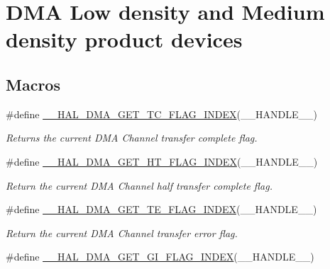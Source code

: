 \hypertarget{group___d_m_a___low__density___medium__density___product__devices}{}\section{D\+MA Low density and Medium density product devices}
\label{group___d_m_a___low__density___medium__density___product__devices}
\subsection*{Macros}
\begin{DoxyCompactItemize}
\item 
\#define \hyperlink{group___d_m_a___low__density___medium__density___product__devices_gae3feef5ea50ff13a6a5b98cb353c87b0}{\+\_\+\+\_\+\+H\+A\+L\+\_\+\+D\+M\+A\+\_\+\+G\+E\+T\+\_\+\+T\+C\+\_\+\+F\+L\+A\+G\+\_\+\+I\+N\+D\+EX}(\+\_\+\+\_\+\+H\+A\+N\+D\+L\+E\+\_\+\+\_\+)
\begin{DoxyCompactList}\small\item\em Returns the current D\+MA Channel transfer complete flag. \end{DoxyCompactList}\item 
\#define \hyperlink{group___d_m_a___low__density___medium__density___product__devices_ga0095f5f3166a82bedc67744ac94acfba}{\+\_\+\+\_\+\+H\+A\+L\+\_\+\+D\+M\+A\+\_\+\+G\+E\+T\+\_\+\+H\+T\+\_\+\+F\+L\+A\+G\+\_\+\+I\+N\+D\+EX}(\+\_\+\+\_\+\+H\+A\+N\+D\+L\+E\+\_\+\+\_\+)
\begin{DoxyCompactList}\small\item\em Return the current D\+MA Channel half transfer complete flag. \end{DoxyCompactList}\item 
\#define \hyperlink{group___d_m_a___low__density___medium__density___product__devices_ga5e765bb3b1c5fc9f1b1abbbb764250bc}{\+\_\+\+\_\+\+H\+A\+L\+\_\+\+D\+M\+A\+\_\+\+G\+E\+T\+\_\+\+T\+E\+\_\+\+F\+L\+A\+G\+\_\+\+I\+N\+D\+EX}(\+\_\+\+\_\+\+H\+A\+N\+D\+L\+E\+\_\+\+\_\+)
\begin{DoxyCompactList}\small\item\em Return the current D\+MA Channel transfer error flag. \end{DoxyCompactList}\item 
\#define \hyperlink{group___d_m_a___low__density___medium__density___product__devices_ga718c628ea8c112c5b09bc61c52b86e75}{\+\_\+\+\_\+\+H\+A\+L\+\_\+\+D\+M\+A\+\_\+\+G\+E\+T\+\_\+\+G\+I\+\_\+\+F\+L\+A\+G\+\_\+\+I\+N\+D\+EX}(\+\_\+\+\_\+\+H\+A\+N\+D\+L\+E\+\_\+\+\_\+)

\end{DoxyCompactItemize}
